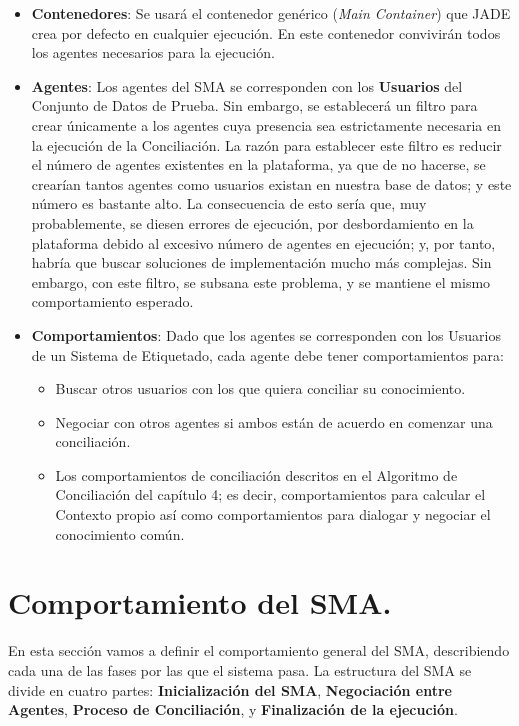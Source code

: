 \begin{itemize}
	\item {\bf Contenedores}: Se usará el contenedor genérico (\emph{Main Container}) que JADE crea por defecto en cualquier ejecución. En este contenedor convivirán todos los agentes necesarios para la ejecución.
	\item {\bf Agentes}: Los agentes del SMA se corresponden con los {\bf Usuarios} del Conjunto de Datos de Prueba. Sin embargo, se establecerá un filtro para crear únicamente a los agentes cuya presencia sea estrictamente necesaria en la ejecución de la Conciliación. La razón para establecer este filtro es reducir el número de agentes existentes en la plataforma, ya que de no hacerse, se crearían tantos agentes como usuarios existan en nuestra base de datos; y este número es bastante alto. La consecuencia de esto sería que, muy probablemente, se diesen errores de ejecución, por desbordamiento en la plataforma debido al excesivo número de agentes en ejecución; y, por tanto, habría que buscar soluciones de implementación mucho más complejas. Sin embargo, con este filtro, se subsana este problema, y se mantiene el mismo comportamiento esperado.
	\item {\bf Comportamientos}: Dado que los agentes se corresponden con los Usuarios de un Sistema de Etiquetado, cada agente debe tener comportamientos para:
	\begin{itemize}
         	\item  Buscar otros usuarios con los que quiera conciliar su conocimiento. 
	         \item  Negociar con otros agentes si ambos están de acuerdo en comenzar una conciliación.
		\item Los comportamientos de conciliación descritos en el Algoritmo de Conciliación del capítulo 4; es decir, comportamientos para calcular el Contexto propio así como comportamientos para dialogar y negociar el conocimiento común.
	\end{itemize}
\end{itemize}







\section{Comportamiento del SMA.}

En esta sección vamos a definir el comportamiento general del SMA, describiendo cada una de las fases por las que el sistema pasa. La estructura del SMA se divide en cuatro partes: {\bf Inicialización del SMA}, {\bf Negociación entre Agentes}, {\bf Proceso de Conciliación}, y {\bf Finalización de la ejecución}.


